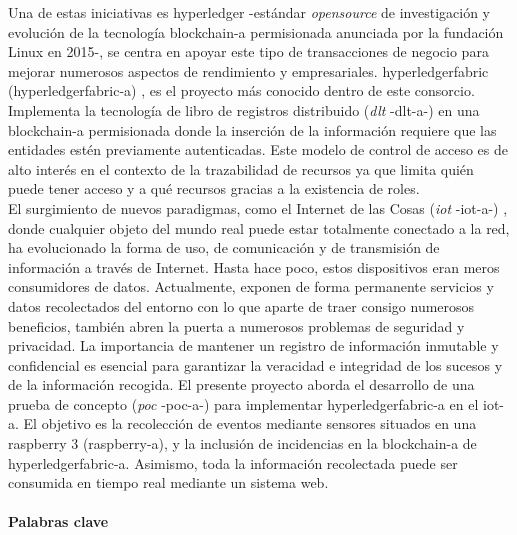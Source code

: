 \documentclass[12pt,a4paper, twoside]{report}
\begin{document}
	Una de estas iniciativas es \gls{hyperledger} \cite{hyperledger:url} -estándar \textit{\gls{opensource}} de investigación y evolución de la tecnología \gls{blockchain-a} permisionada anunciada por la fundación Linux en 2015-, se centra en apoyar este tipo de transacciones de negocio para mejorar numerosos aspectos de rendimiento y empresariales. \gls{hyperledgerfabric} (\gls{hyperledgerfabric-a}) \cite{hyperledgerfabric:url}, es el proyecto más conocido dentro de este consorcio. Implementa la tecnología de libro de registros distribuido (\textit{\gls{dlt}} -\gls{dlt-a}-) \cite{wattenhofer:DLT} en una \gls{blockchain-a} permisionada donde la inserción de la información requiere que las entidades estén previamente autenticadas. Este modelo de control de acceso es de alto interés en el contexto de la trazabilidad de recursos ya que limita quién puede tener acceso y a qué recursos gracias a la existencia de roles. \\
		
	El surgimiento de nuevos paradigmas, como el Internet de las Cosas (\textit{\gls{iot}} -\gls{iot-a}-) \cite{christidis:2016:bsciot}, \cite{dorri:2017:TOBI} donde cualquier objeto del mundo real puede estar totalmente conectado a la red, ha evolucionado la forma de uso, de comunicación y de transmisión de información a través de Internet. Hasta hace poco, estos dispositivos eran meros consumidores de datos. Actualmente, exponen de forma permanente servicios y datos recolectados del entorno con lo que aparte de traer consigo numerosos beneficios, también abren la puerta a numerosos problemas de seguridad y privacidad. La importancia de mantener un registro de información inmutable y confidencial es esencial para garantizar la veracidad e integridad de los sucesos y de la información recogida. El presente proyecto aborda el desarrollo de una prueba de concepto (\textit{\gls{poc}} -\gls{poc-a}-) para implementar \gls{hyperledgerfabric-a} en el \gls{iot-a}. El objetivo es la recolección de eventos mediante sensores situados en una \gls{raspberry} 3 (\gls{raspberry-a}), y la inclusión de incidencias en la \gls{blockchain-a} de \gls{hyperledgerfabric-a}. Asimismo, toda la información recolectada puede ser consumida en tiempo real mediante un sistema web.
	
	\newpage	
	
	\paragraph{Palabras clave \\}
	\thispagestyle{empty}
\end{document}
